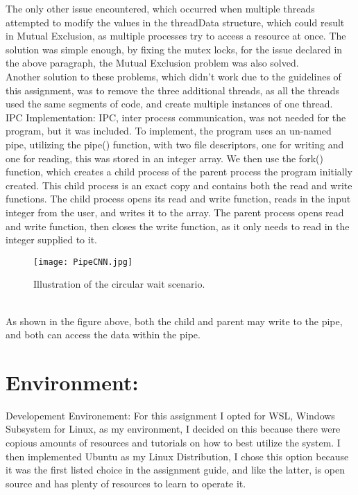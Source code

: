 \documentclass{article}
\begin{document}
The only other issue encountered, which occurred when multiple threads attempted to modify the values in the threadData structure, which could result in Mutual Exclusion, as multiple processes try to access a resource at once. The solution was simple enough, by fixing the mutex locks, for the issue declared in the above paragraph, the Mutual Exclusion problem was also solved.\vspace{.5cm}\\
Another solution to these problems, which didn’t work due to the guidelines of this assignment, was to remove the three additional threads, as all the threads used the same segments of code, and create multiple instances of one thread. \vspace{.5cm}
\vspace{.5cm}\\
IPC Implementation: IPC, inter process communication, was not needed for the program, but it was included. To implement, the program uses an un-named pipe, utilizing the pipe() function, with two file descriptors, one for writing and one for reading, this was stored in an integer array. We then use the fork() function, which creates a child process of the parent process the program initially created. This child process is an exact copy and contains both the read and write functions. The child process opens its read and write function, reads in the input integer from the user, and writes it to the array. The parent process opens read and write function, then closes the write function, as it only needs to read in the integer supplied to it.
\begin{figure}[htbp]
    \centering
    \texttt{[image: PipeCNN.jpg]}
    \caption{Illustration of the circular wait scenario.}
    \label{fig: Pipe Process}
\end{figure}
\vspace{.5 cm}\\
As shown in the figure above, both the child and parent may write to the pipe, and both can access the data within the pipe.

\clearpage
\section{Environment:}\vspace{1 cm}

Developement Environement: For this assignment I opted for WSL, Windows Subsystem for Linux, as my environment,
I decided on this because there were copious amounts of resources and tutorials on how to best utilize the system.
I then implemented Ubuntu as my Linux Distribution, I chose this option because it was the first listed choice
in the assignment guide, and like the latter, is open source and has plenty of resources to learn to operate it.\vspace{.5 cm}\\
\end{document}
